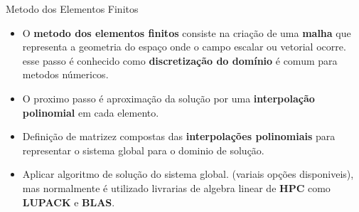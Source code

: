 \documentclass{beamer}
\begin{document}
		\begin{frame}{Metodo dos Elementos Finitos}
			\begin{itemize}
				\item O \textbf{metodo dos elementos finitos} consiste na criação de uma \textbf{malha} que representa a geometria do espaço onde o campo escalar ou vetorial ocorre. esse passo é conhecido como \textbf{discretização do domínio} é comum para metodos númericos.
				\item O proximo passo é aproximação da solução por uma \textbf{interpolação polinomial} em cada elemento.
				\item Definição de matrizez compostas das \textbf{interpolações polinomiais} para representar o sistema global para o dominio de solução.
				\item Aplicar algoritmo de solução do sistema global. (variais opções disponiveis), mas normalmente é utilizado livrarias de algebra linear de \textbf{HPC} como \textbf{LUPACK} e \textbf{BLAS}.
			\end{itemize}
		\end{frame}
\end{document}
